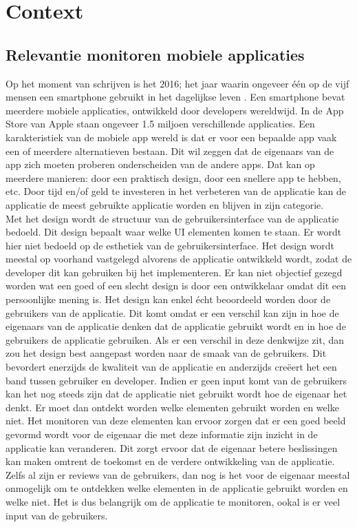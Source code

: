 \chapter{Context}

\section{Relevantie monitoren mobiele applicaties}
Op het moment van schrijven is het 2016; het jaar waarin ongeveer \'e\'en op de vijf mensen een smartphone gebruikt in het dagelijkse leven \cite{SmartphoneUsers}. Een smartphone bevat meerdere mobiele applicaties, ontwikkeld door developers wereldwijd. In de App Store van Apple staan ongeveer 1.5 miljoen verschillende applicaties. Een karakteristiek van de mobiele app wereld is dat er voor een bepaalde app vaak een of meerdere alternatieven bestaan. Dit wil zeggen dat de eigenaars van de app zich moeten proberen onderscheiden van de andere apps. Dat kan op meerdere manieren: door een praktisch design, door een snellere app te hebben, etc. Door tijd en/of geld te investeren in het verbeteren van de applicatie kan de applicatie de meest gebruikte applicatie worden en blijven in zijn categorie. \\

Met het design wordt de structuur van de gebruikersinterface van de applicatie bedoeld. Dit design bepaalt waar welke UI elementen komen te staan. Er wordt hier niet bedoeld op de esthetiek van de gebruikersinterface.
Het design wordt meestal op voorhand vastgelegd alvorens de applicatie ontwikkeld wordt, zodat de developer dit kan gebruiken bij het implementeren. Er kan niet objectief gezegd worden wat een goed of een slecht design is door een ontwikkelaar omdat dit een persoonlijke mening is. Het design kan enkel \'echt beoordeeld worden door de gebruikers van de applicatie. Dit komt omdat er een verschil kan zijn in hoe de eigenaars van de applicatie denken dat de applicatie gebruikt wordt en in hoe de gebruikers de applicatie gebruiken. Als er een verschil in deze denkwijze zit, dan zou het design best aangepast worden naar de smaak van de gebruikers. Dit bevordert enerzijds de kwaliteit van de applicatie en anderzijds cre\"eert het een band tussen gebruiker en developer. Indien er geen input komt van de gebruikers kan het nog steeds zijn dat de applicatie niet gebruikt wordt hoe de eigenaar het denkt. Er moet dan ontdekt worden welke elementen gebruikt worden en welke niet. Het monitoren van deze elementen kan ervoor zorgen dat er een goed beeld gevormd wordt voor de eigenaar die met deze informatie zijn inzicht in de applicatie kan veranderen. Dit zorgt ervoor dat de eigenaar betere beslissingen kan maken omtrent de toekomst en de verdere ontwikkeling van de applicatie. Zelfs al zijn er reviews van de gebruikers, dan nog is het voor de eigenaar meestal onmogelijk om te ontdekken welke elementen in de applicatie gebruikt worden en welke niet. Het is dus belangrijk om de applicatie te monitoren, ookal is er veel input van de gebruikers. \\


